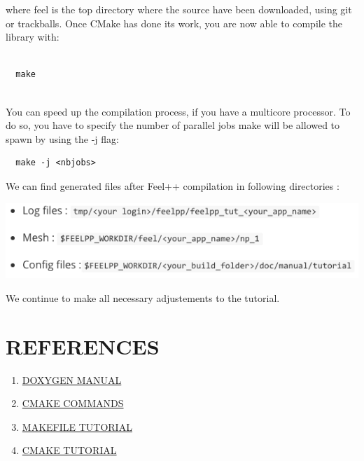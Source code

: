 \documentclass[11pt,utf8]{article}
\begin{document}
 where feel is the top directory where the source have been downloaded, using git or trackballs.
Once CMake has done its work, you are now able to compile the library with:\\
 \begin{center}
 \begin{lstlisting}

  make
 
 \end{lstlisting}
  \end{center}
You can speed up the compilation process, if you have a multicore processor. To do so, you have to specify the number of parallel jobs make will be allowed to spawn by using the -j flag:

   \begin{center}
 \begin{lstlisting}
  make -j <nbjobs>
   \end{lstlisting}
  \end{center}
  
  \newpage
 We can find generated files after Feel++ compilation in following directories :
\begin{center}
 \includegraphics{f1}
 \end{center}
 
 We continue to make all necessary adjustements to the tutorial.

\newpage
\section{REFERENCES}
\begin{enumerate}[1]
\item \href{http://www.stack.nl/~dimitri/doxygen/manual/docblocks.html.}{DOXYGEN MANUAL}   
\item \href{http://www.cmake.org/cmake/help/v3.0/command/option.html}{CMAKE COMMANDS}
\item \href{http://gl.developpez.com/tutoriel/outil/makefile/}{MAKEFILE TUTORIAL}
 \item \href{http://www.cmake.org/cmake-tutorial/}{CMAKE TUTORIAL}
\end{enumerate}
\end{document}
